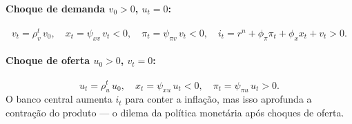 \documentclass[11pt,a4paper]{article}
\begin{document}
\paragraph{Choque de demanda $v_0 > 0$, $u_t = 0$:}
\[
  v_t = \rho_v^t\,v_0,\quad
  x_t = \psi_{xv}\,v_t < 0,\quad
  \pi_t = \psi_{\pi v}\,v_t < 0,\quad
  i_t = r^n + \phi_\pi\pi_t + \phi_x x_t + v_t > 0.
\]

\paragraph{Choque de oferta $u_0 > 0$, $v_t = 0$:}
\[
  u_t = \rho_u^t\,u_0,\quad
  x_t = \psi_{xu}\,u_t < 0,\quad
  \pi_t = \psi_{\pi u}\,u_t > 0.
\]
O banco central aumenta $i_t$ para conter a inflação, mas isso aprofunda
a contração do produto --- o dilema da política monetária após choques de oferta.
\end{document}
